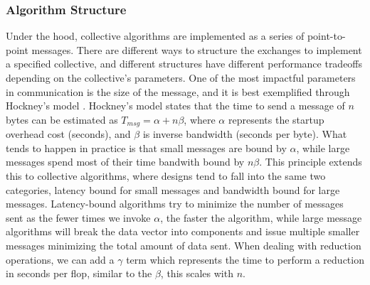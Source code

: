 \subsubsection{Algorithm Structure}\label{sec:CH2-MPI-AlgStructure}
Under the hood, collective algorithms are implemented as a series of point-to-point messages. 
There are different ways to structure the exchanges to implement a specified collective, and different structures have different performance tradeoffs depending on the collective's parameters.
One of the most impactful parameters in communication is the size of the message, and it is best exemplified through Hockney's model \cite{Hockney1994HockenyModel}.
Hockney's model states that the time to send a message of $n$ bytes can be estimated as $T_{msg}=\alpha+n\beta$, where $\alpha$ represents the startup overhead cost (seconds), and $\beta$ is inverse bandwidth (seconds per byte).
What tends to happen in practice is that small messages are bound by $\alpha$, while large messages spend most of their time bandwith bound by $n\beta$.
This principle extends this to collective algorithms, where designs tend to fall into the same two categories, latency bound for small messages and bandwidth bound for large messages.
Latency-bound algorithms try to minimize the number of messages sent as the fewer times we invoke $\alpha$, the faster the algorithm, while large message algorithms will break the data vector into components and issue multiple smaller messages minimizing the total amount of data sent.
When dealing with reduction operations, we can add a $\gamma$ term which represents the time to perform a reduction in seconds per flop, similar to the $\beta$, this scales with $n$.

